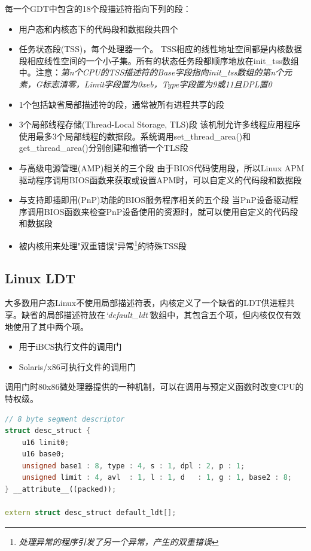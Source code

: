     每一个GDT中包含的18个段描述符指向下列的段：

\begin{itemize}
    \item 用户态和内核态下的代码段和数据段共四个
    \item 任务状态段(TSS)，每个处理器一个。
    \subitem TSS相应的线性地址空间都是内核数据段相应线性空间的一个小子集。所有的状态任务段都顺序地放在init\_tss数组中。注意：\emph{第n个CPU的TSS描述符的Base字段指向init\_tss数组的第n个元素，G标志清零，Limit字段置为0xeb，Type字段置为9或11且DPL置0}
    \item 1个包括缺省局部描述符的段，通常被所有进程共享的段
    \item 3个局部线程存储(Thread-Local Storage, TLS)段
    \subitem 该机制允许多线程应用程序使用最多3个局部线程的数据段。系统调用set\_thread\_area()和get\_thread\_area()分别创建和撤销一个TLS段
    \item 与高级电源管理(AMP)相关的三个段
    \subitem 由于BIOS代码使用段，所以Linux APM驱动程序调用BIOS函数来获取或设置APM时，可以自定义的代码段和数据段
    \item 与支持即插即用(PnP)功能的BIOS服务程序相关的五个段
    \subitem 当PnP设备驱动程序调用BIOS函数来检查PnP设备使用的资源时，就可以使用自定义的代码段和数据段
    \item 被内核用来处理"双重错误"异常\footnote[1]{\emph{处理异常的程序引发了另一个异常，产生的双重错误}}的特殊TSS段
\end{itemize}

\subsection{Linux LDT}

    大多数用户态Linux不使用局部描述符表，内核定义了一个缺省的LDT供进程共享。缺省的局部描述符放在\emph{`default\_ldt'}数组中，其包含五个项，但内核仅仅有效地使用了其中两个项。

\begin{itemize}
    \item 用于iBCS执行文件的调用门
    \item Solaris/x86可执行文件的调用门
\end{itemize}

    调用门时80x86微处理器提供的一种机制，可以在调用与预定义函数时改变CPU的特权级。

\begin{lstlisting}[language=C++]
// 8 byte segment descriptor
struct desc_struct { 
	u16 limit0;
	u16 base0;
	unsigned base1 : 8, type : 4, s : 1, dpl : 2, p : 1;
	unsigned limit : 4, avl  : 1, l : 1, d   : 1, g : 1, base2 : 8;
} __attribute__((packed)); 

extern struct desc_struct default_ldt[];
\end{lstlisting}

